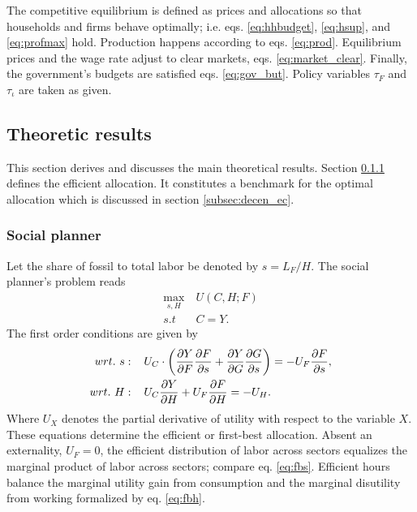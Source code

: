 The competitive equilibrium is defined as prices and allocations so that households and firms behave optimally; i.e. eqs. \eqref{eq:hhbudget}, \eqref{eq:hsup}, and \eqref{eq:profmax} hold. Production happens according to eqs. \eqref{eq:prod}.  Equilibrium prices and the wage rate adjust to clear markets, eqs. \eqref{eq:market_clear}. Finally, the government's budgets are satisfied eqs. \eqref{eq:gov_but}. Policy variables $\tau_F$ and $\tau_\iota$ are taken as given. 

\subsection{Theoretic results}\label{sec:theory}
This section derives and discusses the main theoretical results. Section \ref{subsec:sp} defines the efficient allocation. It constitutes a benchmark for the optimal allocation which is discussed in section \ref{subsec:decen_ec}. 
\subsubsection{Social planner}\label{subsec:sp}
Let the share of fossil to total labor be denoted by $s=L_F/H$. The social planner's problem reads
\begin{align}
\underset{s, H}{\max}\ & U(C,H; F)\\ s.t\ \ & C=Y.
\end{align}
The first order conditions are given by
\begin{align}
wrt.\ s:\hspace{4mm} & U_C \cdot \left(\frac{\partial{Y}}{\partial{F}}\frac{\partial{F}}{\partial{s}}+\frac{\partial{Y}}{\partial{G}}\frac{\partial{G}}{\partial{s}}\right)=-U_F\frac{\partial{F}}{\partial{s}}, \label{eq:fbs}
\\
wrt.\ H:\hspace{4mm} & U_C\frac{\partial{Y}}{\partial{H}}+U_F\frac{\partial{F}}{\partial{H}}=-U_H\label{eq:fbh}. 
\end{align}
Where $U_X$ denotes the partial derivative of utility with respect to the variable $X$.
These equations determine the efficient or first-best allocation. 
Absent an externality, $U_F=0$, the efficient distribution of labor across sectors equalizes the marginal product of labor across sectors; compare eq. \eqref{eq:fbs}. Efficient hours balance the marginal utility gain from consumption and the marginal disutility from working formalized by eq. \eqref{eq:fbh}. 

